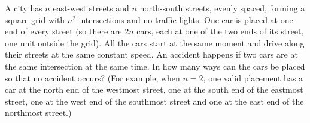 A city has $n$ east-west streets and $n$ north-south streets, evenly spaced, forming a square grid with $n^2$ intersections and no traffic lights. One car is placed at one end of every street (so there are $2n$ cars, each at one of the two ends of its street, one unit outside the grid). All the cars start at the same moment and drive along their streets at the same constant speed. An accident happens if two cars are at the same intersection at the same time. In how many ways can the cars be placed so that no accident occurs? (For example, when $n=2$, one valid placement has a car at the north end of the westmost street, one at the south end of the eastmost street, one at the west end of the southmost street and one at the east end of the northmost street.)
